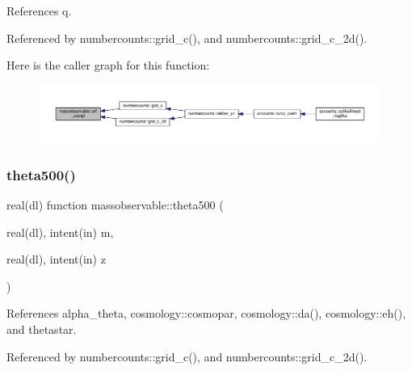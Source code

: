 References q.



Referenced by numbercounts\+::grid\+\_\+c(), and numbercounts\+::grid\+\_\+c\+\_\+2d().

Here is the caller graph for this function\+:
\nopagebreak
\begin{figure}[H]
\begin{center}
\leavevmode
\includegraphics[width=350pt]{namespacemassobservable_ac95513e74fbf07c2becffe8985dfc31b_icgraph}
\end{center}
\end{figure}
\mbox{\label{namespacemassobservable_a4be614d859b3c2e06a7674a7af153ff5}} 
\subsubsection{\texorpdfstring{theta500()}{theta500()}}
{\footnotesize\ttfamily real(dl) function massobservable\+::theta500 (\begin{DoxyParamCaption}\item[{real(dl), intent(in)}]{m,  }\item[{real(dl), intent(in)}]{z }\end{DoxyParamCaption})}



References alpha\+\_\+theta, cosmology\+::cosmopar, cosmology\+::da(), cosmology\+::eh(), and thetastar.



Referenced by numbercounts\+::grid\+\_\+c(), and numbercounts\+::grid\+\_\+c\+\_\+2d().

